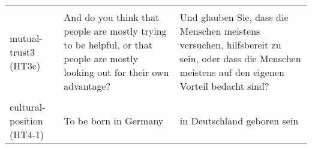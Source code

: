\documentclass[]{article}
\begin{document}
\begin{table}[!h]
\begin{tabular}[t]{>{\raggedright\arraybackslash}p{3cm}>{\raggedright\arraybackslash}p{7cm}>{\raggedright\arraybackslash}p{7cm}}
\cellcolor{gray!6}{mutual-trust2 (HT3b)} & \cellcolor{gray!6}{Do you think most people try to take advantage of you when they have the opportunity, or do most people try to be fair?} & \cellcolor{gray!6}{Glauben Sie, dass die meisten Menschen versuchen, Sie auszunutzen, wenn sie die Gelegenheit dazu haben, oder versuchen die meisten Menschen, sich fair zu verhalten?}\\
mutual-trust3 (HT3c) & And do you think that people are mostly trying to be helpful, or that people are mostly looking out for their own advantage? & Und glauben Sie, dass die Menschen meistens versuchen, hilfsbereit zu sein, oder dass die Menschen meistens auf den eigenen Vorteil bedacht sind?\\
\cellcolor{gray!6}{cultural-position (HT4)} & \cellcolor{gray!6}{Some people think that the following points are important to be truly German. Others do not think they are important. How important do you think the following points are to being German?} & \cellcolor{gray!6}{Manche Leute meinen, dass die folgenden Punkte wichtig sind, um wirklich deutsch zu sein. Andere halten diese nicht für wichtig. Für wie wichtig halten Sie die folgenden Punkte, um deutsch zu sein?}\\
cultural-position (HT4-1) & To be born in Germany & in Deutschland geboren sein\\
\bottomrule
\end{tabular}
\end{table}
\end{document}
